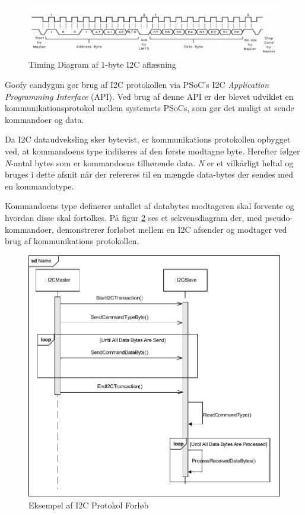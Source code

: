 \begin{figure}[H]
	\centering
	\includegraphics[width=\textwidth] {Systemarkitektur/images/I2CTimingDiagram}
	\caption{Timing Diagram af 1-byte I2C aflæsning}
	\label{fig:I2CTimingDiagram}
\end{figure}

Goofy candygun gør brug af I2C protokollen via PSoC's I2C \textit{Application Programming Interface} (API). Ved brug af denne API er der blevet udviklet en kommunikationsprotokol mellem systemets PSoCs, som gør det muligt at sende kommandoer og data.

Da I2C dataudveksling sker bytevist, er kommunikations protokollen opbygget ved, at kommandoens type indikeres af den første modtagne byte. Herefter følger \textit{N}-antal bytes som er kommandoens tilhørende data. \textit{N} er et vilkårligt heltal og bruges i dette afsnit når der refereres til en mængde data-bytes der sendes med en kommandotype.

Kommandoens type definerer antallet af databytes modtageren skal forvente og hvordan disse skal fortolkes. På figur \ref{fig:I2CProtokolEksempel} ses et sekvensdiagram der, med pseudo-kommandoer, demonstrerer forløbet mellem en I2C afsender og modtager ved brug af kommunikations protokollen.

\begin{figure}[H]
	\centering
	\includegraphics[width=\textwidth] {Systemarkitektur/images/I2CProtocol}
	\caption{Eksempel af I2C Protokol Forløb}
	\label{fig:I2CProtokolEksempel}
\end{figure}

